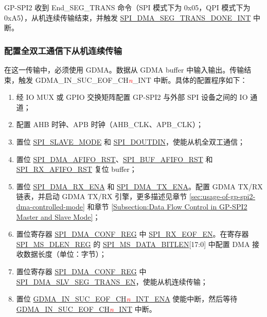 \documentclass[main\_\_CN.tex]{subfiles}
\begin{document}
GP-SPI2 收到 End\_SEG\_TRANS 命令（SPI 模式下为 0x05，QPI 模式下为 0xA5），从机连续传输结束，并触发 \hyperref[int:SPIDMASEGTRANSDONEINT]{SPI\_DMA\_SEG\_TRANS\_DONE\_INT} 中断。

\subsubsection{配置全双工通信下从机连续传输}\label{sec:gp-spi2-slave-fd-seg-trans}
在这一传输中，必须使用 GDMA。数据从 GDMA buffer 中输入输出。传输结束，触发 GDMA\_IN\_SUC\_EOF\_CH\textcolor{red}{\it{n}}\_INT  中断。具体的配置程序如下：

\begin{enumerate}
   \item 经 IO MUX 或 GPIO 交换矩阵配置 GP-SPI2 与外部 SPI 设备之间的 IO 通道；
   \item 配置 AHB 时钟、APB 时钟（AHB\_CLK、APB\_CLK）；

    \item 置位 \hyperref[fielddesc:SPISLAVEMODE]{SPI\_SLAVE\_MODE} 和 \hyperref[fielddesc:SPIDOUTDIN]{SPI\_DOUTDIN}，使能从机全双工通信；

    \item 置位 \hyperref[fielddesc:SPIDMAAFIFORST]{SPI\_DMA\_AFIFO\_RST}、\hyperref[fielddesc:SPIBUFAFIFORST]{SPI\_BUF\_AFIFO\_RST} 和 \hyperref[fielddesc:SPIRXAFIFORST]{SPI\_RX\_AFIFO\_RST} 复位 buffer；

    \item 置位 \hyperref[fielddesc:SPIDMARXENA]{SPI\_DMA\_RX\_ENA} 和 \hyperref[fielddesc:SPIDMATXENA]{SPI\_DMA\_TX\_ENA}。配置 GDMA TX/RX 链表，并启动 GDMA TX/RX 引擎，更多描述见章节 \ref{sec:usage-of-gp-spi2-dma-controlled-mode} 和章节 \ref{Subsection:Data Flow Control in GP-SPI2 Master and Slave Mode}；

    \item 置位寄存器 \hyperref[regdesc:SPIDMACONFREG]{SPI\_DMA\_CONF\_REG} 中 \hyperref[fielddesc:SPIRXEOFEN]{SPI\_RX\_EOF\_EN}。在寄存器 \hyperref[regdesc:SPIMSDLENREG]{SPI\_MS\_DLEN\_REG} 的 \hyperref[fielddesc:SPIMSDATABITLEN]{SPI\_MS\_DATA\_BITLEN}[17:0] 中配置 DMA 接收数据长度（单位：字节）；

    \item 置位寄存器 \hyperref[regdesc:SPIDMACONFREG]{SPI\_DMA\_CONF\_REG} 中 \hyperref[fielddesc:SPIDMASLVSEGTRANSEN]{SPI\_DMA\_SLV\_SEG\_TRANS\_EN}，使能从机连续传输；

    \item 置位 \hyperref[fielddesc:GDMAINSUCEOFCHNINTENA]{GDMA\_IN\_SUC\_EOF\_CH\textcolor{red}{\it{n}}\_INT\_ENA}  使能中断，然后等待 \hyperref[int:GDMAINSUCEOFINT]{GDMA\_IN\_SUC\_EOF\_CH\textcolor{red}{\it{n}}\_INT} 中断。
\end{enumerate}
\end{document}
